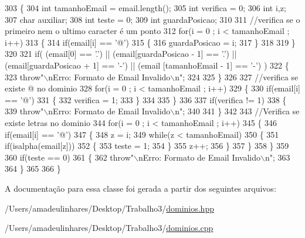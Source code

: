\begin{DoxyCode}
303 \{
304   \textcolor{keywordtype}{int} tamanhoEmail = email.length();
305   \textcolor{keywordtype}{int} verifica = 0;
306   \textcolor{keywordtype}{int} i,z;
307   \textcolor{keywordtype}{char} auxiliar;
308   \textcolor{keywordtype}{int} teste = 0;
309   \textcolor{keywordtype}{int} guardaPosicao;
310 
311   \textcolor{comment}{//verifica se o primeiro nem o ultimo caracter é um ponto}
312   \textcolor{keywordflow}{for}(i = 0 ; i < tamanhoEmail ; i++)
313   \{
314     \textcolor{keywordflow}{if}(email[i] == \textcolor{charliteral}{'@'})
315     \{
316       guardaPosicao = i;
317     \}
318 
319   \}
320 
321   \textcolor{keywordflow}{if}( (email[0] == \textcolor{charliteral}{'.'}) || (email[guardaPosicao - 1] == \textcolor{charliteral}{'.'}) || (email[guardaPosicao + 1] == \textcolor{charliteral}{'-'}) || (email
      [tamanhoEmail - 1] == \textcolor{charliteral}{'-'}) )
322   \{
323     \textcolor{keywordflow}{throw}\textcolor{stringliteral}{"\(\backslash\)nErro: Formato de Email Invalido\(\backslash\)n"};
324 
325   \}
326 
327   \textcolor{comment}{//verifica se existe @ no dominio}
328   \textcolor{keywordflow}{for}(i = 0 ; i < tamanhoEmail ; i++)
329   \{
330     \textcolor{keywordflow}{if}(email[i] == \textcolor{charliteral}{'@'})
331     \{
332       verifica = 1;
333     \}
334 
335   \}
336 
337   \textcolor{keywordflow}{if}(verifica != 1)
338   \{
339     \textcolor{keywordflow}{throw}\textcolor{stringliteral}{"\(\backslash\)nErro: Formato de Email Invalido\(\backslash\)n"};
340 
341   \}
342 
343   \textcolor{comment}{//Verifica se existe letras no dominio}
344   \textcolor{keywordflow}{for}(i = 0 ; i < tamanhoEmail ; i++)
345   \{
346     \textcolor{keywordflow}{if}(email[i] == \textcolor{charliteral}{'@'})
347     \{
348       z = i;
349       \textcolor{keywordflow}{while}(z < tamanhoEmail)
350       \{
351         \textcolor{keywordflow}{if}(isalpha(email[z]))
352         \{
353           teste = 1;
354         \}
355         z++;
356       \}
357     \}
358   \}
359 
360   \textcolor{keywordflow}{if}(teste == 0)
361   \{
362     \textcolor{keywordflow}{throw}\textcolor{stringliteral}{"\(\backslash\)nErro: Formato de Email Invalido\(\backslash\)n"};
363 
364   \}
365 
366 \}
\end{DoxyCode}


A documentação para essa classe foi gerada a partir dos seguintes arquivos\+:\begin{DoxyCompactItemize}
\item 
/\+Users/amadeulinhares/\+Desktop/\+Trabalho3/\mbox{\hyperlink{dominios_8hpp}{dominios.\+hpp}}\item 
/\+Users/amadeulinhares/\+Desktop/\+Trabalho3/\mbox{\hyperlink{dominios_8cpp}{dominios.\+cpp}}\end{DoxyCompactItemize}
